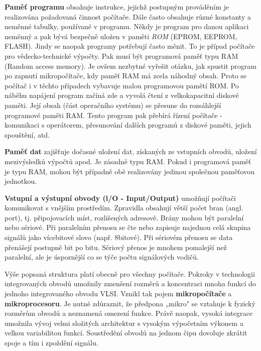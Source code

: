     \textbf{Paměť programu} obsahuje instrukce, jejichž postupným prováděním je realizována 
    požadovaná činnost počítače. Dále často obsahuje různé konstanty a neměnné tabulky, používané v 
    programu. Někdy je program pro danou aplikaci neměnný a pak bývá bezpečně uložen v paměti 
    \emph{ROM} (EPROM, EEPROM, FLASH). Jindy se naopak programy potřebují často měnit. To je případ 
    počítače pro vědecko-technické výpočty. Pak musí být programová paměť typu RAM (Random access 
    memory). Je ovšem nezbytné vyřešit otázku, jak spustit program po zapnutí mikropočítače, kdy 
    paměť RAM má zcela náhodný obsah. Proto se počítač i v těchto případech vybavuje malou 
    programovou pamětí ROM. Po náběhu napájení program začíná zde a vyvolá čtení z velkokapacitní 
    diskové paměti. Její obsah (část operačního systému) se přesune do rozsáhlejší programové 
    paměti RAM. Tento program pak přebírá řízení počítače - komunikaci s operátorem, přesunování 
    dalších programů z diskové paměti, jejich spouštění, atd.
    
    \textbf{Paměť dat} zajišťuje dočasné uložení dat, získaných ze vstupních obvodů, uložení 
    mezivýsledků výpočtů apod. Je zásadně typu RAM. Pokud i programová paměť je typu RAM, mohou být 
    případně obě realizovány jedinou společnou paměťovou jednotkou.


    \textbf{Vstupní a výstupní obvody (l/O - Input/Output)} umožňují počítači komunikovat s vnějším 
    prostředím. Zpravidla obsahují větší počet bran (angl. port), tj. připojovacích míst, 
    rozlišených adresově. Brány mohou být paralelní nebo sériové. Při paralelním přenosu se čte 
    nebo zapisuje najednou celá skupina signálů jako vícebitové slovo (např. 8bitové). Při sériovém 
    přenosu se data přenášejí postupně bit po bitu. Sériový přenos je mnohem pomalejší než 
    paralelní, ale je úspornější co se týče počtu signálových vodičů.

    Výše popsaná struktura platí obecně pro všechny počítače. Pokroky v technologii integrovaných 
    obvodů umožnily zmenšení rozměrů a koncentraci mnoha funkcí do jednoho integrovaného obvodu 
    VLSI. Vznikl tak pojem \textbf{mikropočítače} a \textbf{mikroprocesoru}. Je nutné zdůraznit, že 
    předpona „mikro" se vztahuje k fyzický rozměrům obvodů a neznamená omezení funkce. Právě 
    naopak, vysoká integrace umožnila vývoj velmi složitých architektur s vysokým výpočetním 
    výkonem a velkou variabilitou funkcí. Soustředění obvodů na jednom čipu dovoluje zkrátit spoje 
    a tím i zpoždění signálu.   
       
